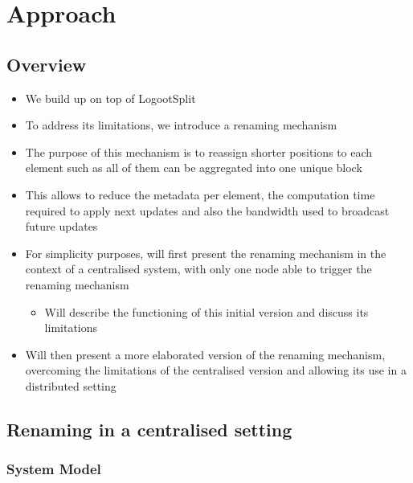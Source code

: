 \documentclass{article}
\begin{document}
\section{Approach}

\subsection{Overview}

\begin{itemize}
    \item We build up on top of LogootSplit
    \item To address its limitations, we introduce a renaming mechanism
    \item The purpose of this mechanism is to reassign shorter positions to each element such as all of them can be aggregated into one unique block
    \item This allows to reduce the metadata per element, the computation time required to apply next updates and also the bandwidth used to broadcast future updates
    \item For simplicity purposes, will first present the renaming mechanism in the context of a centralised system, with only one node able to trigger the renaming mechanism
    \begin{itemize}
        \item Will describe the functioning of this initial version and discuss its limitations
    \end{itemize}
    \item Will then present a more elaborated version of the renaming mechanism, overcoming the limitations of the centralised version and allowing its use in a distributed setting
\end{itemize}

\subsection{Renaming in a centralised setting}

\subsubsection{System Model}

\end{document}
